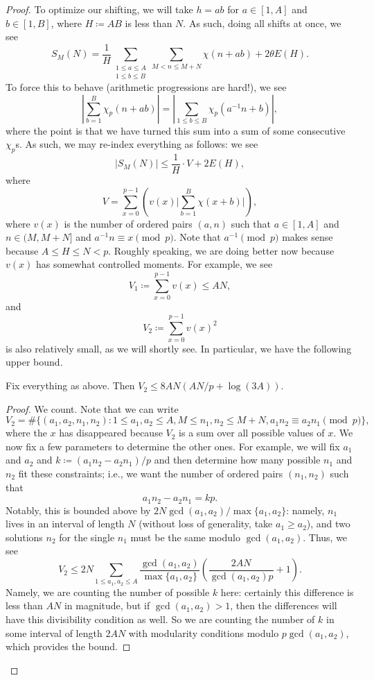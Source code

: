 \documentclass[../notes.tex]{subfiles}
\begin{document}
\begin{proof}
	To optimize our shifting, we will take $h=ab$ for $a\in[1,A]$ and $b\in[1,B]$, where $H\coloneqq AB$ is less than $N$. As such, doing all shifts at once, we see
	\[S_M(N)=\frac1H\sum_{\substack{1\le a\le A\\1\le b\le B}}\sum_{M<n\le M+N}\chi(n+ab)+2\theta E(H).\]
	To force this to behave (arithmetic progressions are hard!), we see
	\[\left|\sum_{b=1}^B\chi_p(n+ab)\right|=\left|\sum_{1\le b\le B}\chi_p\left(a^{-1}n+b\right)\right|,\]
	where the point is that we have turned this sum into a sum of some consecutive $\chi_p$s. As such, we may re-index everything as follows: we see
	\[|S_M(N)|\le\frac1H\cdot V+2E(H),\]
	where
	\[V=\sum_{x=0}^{p-1}\left(v(x)\Bigg|\sum_{b=1}^B\chi(x+b)\Bigg|\right),\]
	where $v(x)$ is the number of ordered pairs $(a,n)$ such that $a\in[1,A]$ and $n\in(M,M+N]$ and $a^{-1}n\equiv x\pmod p$. Note that $a^{-1}\pmod p$ makes sense because $A\le H\le N<p$. Roughly speaking, we are doing better now because $v(x)$ has somewhat controlled moments. For example, we see
	\[V_1\coloneqq\sum_{x=0}^{p-1}v(x)\le AN,\]
	and
	\[V_2\coloneqq\sum_{x=0}^{p-1}v(x)^2\]
	is also relatively small, as we will shortly see. In particular, we have the following upper bound.
	\begin{lemma}
		Fix everything as above. Then $V_2\le 8AN(AN/p+\log(3A))$.
	\end{lemma}
	\begin{proof}
		We count. Note that we can write
		\[V_2=\#\{(a_1,a_2,n_1,n_2):1\le a_1,a_2\le A,M\le n_1,n_2\le M+N,a_1n_2\equiv a_2n_1\pmod p\},\]
		where the $x$ has disappeared because $V_2$ is a sum over all possible values of $x$. We now fix a few parameters to determine the other ones. For example, we will fix $a_1$ and $a_2$ and $k\coloneqq(a_1n_2-a_2n_1)/p$ and then determine how many possible $n_1$ and $n_2$ fit these constraints; i.e., we want the number of ordered pairs $(n_1,n_2)$ such that
		\[a_1n_2-a_2n_1=kp.\]
		Notably, this is bounded above by $2N\gcd(a_1,a_2)/\max\{a_1,a_2\}$: namely, $n_1$ lives in an interval of length $N$ (without loss of generality, take $a_1\ge a_2$), and two solutions $n_2$ for the single $n_1$ must be the same modulo $\gcd(a_1,a_2)$. Thus, we see
		\[V_2\le 2N\sum_{1\le a_1,a_2\le A}\frac{\gcd(a_1,a_2)}{\max\{a_1,a_2\}}\left(\frac{2AN}{\gcd(a_1,a_2)p}+1\right).\]
		Namely, we are counting the number of possible $k$ here: certainly this difference is less than $AN$ in magnitude, but if $\gcd(a_1,a_2)>1$, then the differences will have this divisibility condition as well. So we are counting the number of $k$ in some interval of length $2AN$ with modularity conditions modulo $p\gcd(a_1,a_2)$, which provides the bound.


\end{proof}
\end{proof}
\end{document}
